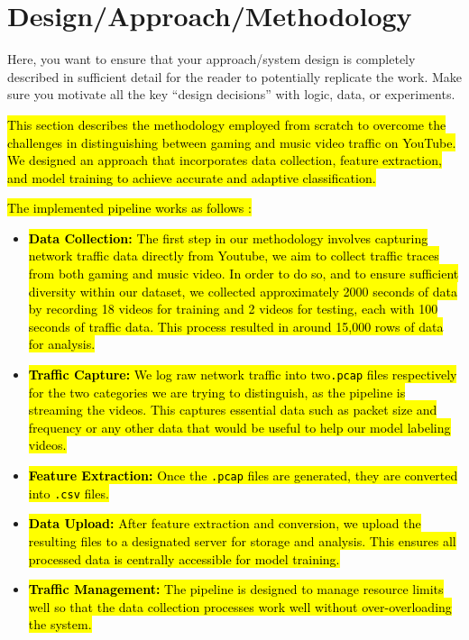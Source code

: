 \section{Design/Approach/Methodology} 
Here, you want to ensure that your approach/system design is completely described in sufficient detail for the reader to potentially replicate the work. Make sure you motivate all the key ``design decisions'' with logic, data, or experiments.


\label{sec:design}

\hl{This section describes the methodology employed from scratch to overcome the challenges in distinguishing between gaming and music video traffic on YouTube. We designed an approach that incorporates data collection, feature extraction, and model training to achieve accurate and adaptive classification.}

\vspace{2mm}


\hl{The implemented pipeline works as follows :}
\begin{itemize}
    \item \hl{\textbf{Data Collection:} The first step in our methodology involves capturing network traffic data directly from Youtube, we aim to collect traffic traces from both gaming and music video. In order to do so, and to ensure sufficient diversity within our dataset, we collected approximately 2000 seconds of data by recording 18 videos for training and 2 videos for testing, each with 100 seconds of traffic data. This process resulted in around 15,000 rows of data for analysis.}
    \item \hl{\textbf{Traffic Capture:} We log raw network traffic into two\texttt{.pcap} files respectively for the two categories we are trying to distinguish, as the pipeline is streaming the videos. This captures essential data such as packet size and frequency or any other data that would be useful to help our model labeling videos.}
    \item \hl{\textbf{Feature Extraction:} Once the \texttt{.pcap} files are generated, they are converted into \texttt{.csv} files.}
    \item \hl{\textbf{Data Upload:} After feature extraction and conversion, we upload the resulting files to a designated server for storage and analysis. This ensures all processed data is centrally accessible for model training.}
    \item \hl{\textbf{Traffic Management:} The pipeline is designed to manage resource limits well so that the data collection processes work well without over-overloading the system.}
\end{itemize}

